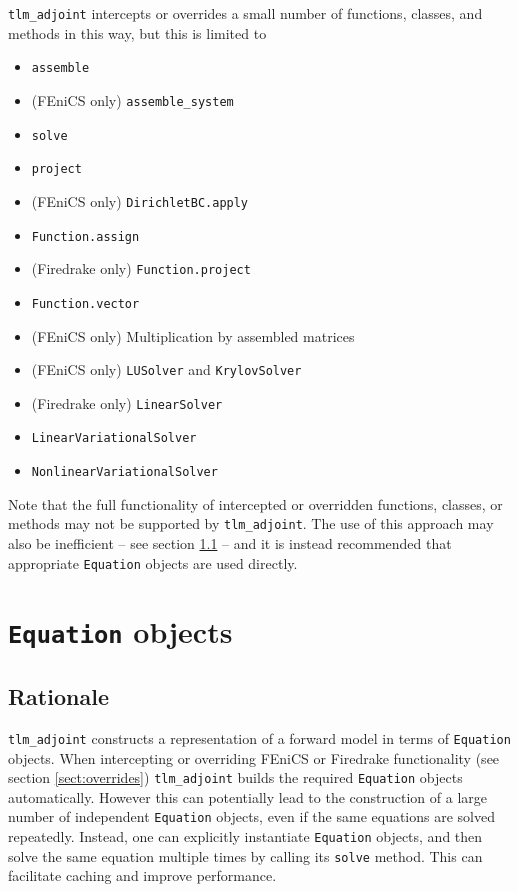 \documentclass[11pt]{article}
\begin{document}
\texttt{tlm\_adjoint} intercepts or overrides a small number of functions,
classes, and methods in this way, but this is limited to
\begin{itemize}
  \item \texttt{assemble}
  \item (FEniCS only) \texttt{assemble\_system}
  \item \texttt{solve}
  \item \texttt{project}
  \item (FEniCS only) \texttt{DirichletBC.apply}
  \item \texttt{Function.assign}
  \item (Firedrake only) \texttt{Function.project}
  \item \texttt{Function.vector}
  \item (FEniCS only) Multiplication by assembled matrices
  \item (FEniCS only) \texttt{LUSolver} and \texttt{KrylovSolver}
  \item (Firedrake only) \texttt{LinearSolver}
  \item \texttt{LinearVariationalSolver}
  \item \texttt{NonlinearVariationalSolver}
\end{itemize}

Note that the full functionality of intercepted or overridden functions,
classes, or methods may not be supported by \texttt{tlm\_adjoint}. The use of
this approach may also be inefficient -- see section
\ref{sect:Equation_rationale} -- and it is instead recommended that appropriate
\texttt{Equation} objects are used directly.

\section{\texttt{Equation} objects}\label{sect:Equation}

\subsection{Rationale}\label{sect:Equation_rationale}

\texttt{tlm\_adjoint} constructs a representation of a forward model in terms
of \texttt{Equation} objects. When intercepting or overriding FEniCS or
Firedrake functionality (see section \ref{sect:overrides})
\texttt{tlm\_adjoint} builds the required \texttt{Equation} objects
automatically. However this can potentially lead to the construction of a large
number of independent \texttt{Equation} objects, even if the same equations are
solved repeatedly. Instead, one can explicitly instantiate \texttt{Equation}
objects, and then solve the same equation multiple times by calling its
\texttt{solve} method. This can facilitate caching and improve performance.
\end{document}
